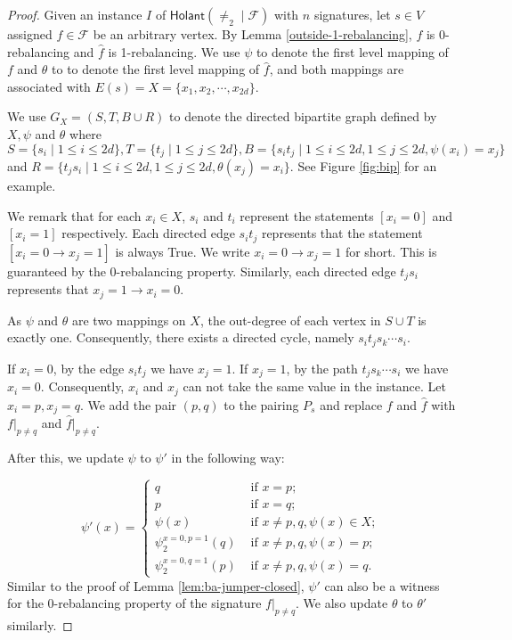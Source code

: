 \documentclass[a4paper,UKenglish,cleveref, autoref, thm-restate]{lipics-v2021}
\newcommand{\hol}[0]{\textsf{Holant}}
\newcommand{\ba}[1][0]{{{#1}-rebalancing}}
\begin{document}
\begin{proof}
    Given an instance $I$ of $\hol(\neq_2\mid\mathcal{F})$ with $n$ signatures, let $s\in V$ assigned $f\in\mathcal{F}$ be an arbitrary vertex. By Lemma \ref{outside-1-rebalancing}, $f$ is \ba[0] and $\hat{f}$ is \ba[1]. We use $\psi$ to denote the first level mapping of $f$ and $\theta$ to to denote the first level mapping of $\hat{f}$, and both mappings are associated with $E(s)=X=\{x_1,x_2, \cdots, x_{2d}\}$.

    We use $G_X=(S,T,B\cup R)$ to denote the directed bipartite graph defined by $X,\psi$ and $\theta$ where $S=\{s_i\mid 1\le i\le 2d\},T=\{t_j\mid 1\le j\le 2d\}, B=\{s_it_j\mid 1\le i\le 2d,1\le j\le 2d, \psi(x_i)=x_j\}$ and $R=\{t_js_i\mid 1\le i\le 2d,1\le j\le 2d, \theta(x_j)=x_i\}$. See Figure \ref{fig:bip} for an example.

We remark that for each $x_i\in X$, $s_i$ and $t_i$ represent the statements $[x_i=0]$ and $[x_i=1]$ respectively. Each directed edge $s_it_j$ represents that the statement $[x_i=0\to x_j=1]$ is always True. We write $x_i=0\to x_j=1$ for short. This is guaranteed by the 0-rebalancing property. Similarly, each directed edge $t_js_i$ represents that $ x_j=1\to x_i=0$.

     As $\psi$ and $\theta$ are two mappings on $X$, the out-degree of each vertex in $S\cup T$ is exactly one. Consequently, there exists a directed cycle, namely $s_it_js_k\cdots s_i$.

     If $x_i=0$, by the edge $s_it_j$ we have $x_j=1$. If $x_j=1$, by the path $t_js_k\cdots s_i$ we have $x_i=0$. Consequently, $x_i$ and $x_j$ can not take the same value in the instance. Let $x_i=p,x_j=q$.  We add the pair $(p,q)$ to the pairing $P_s$ and replace $f$ and $\hat{f}$ with $f|_{p\neq q}$ and $\hat{f}|_{p\neq q}$.

    After this, we update $\psi$ to $\psi'$ in the following way:

     \[
\psi'(x)= \left \{ \begin{array}{ll}
q &  \text{ if }  x=p;  \\
p &  \text{ if }  x=q; \\
    \psi(x) &  \text{ if } x\neq p,q, \psi(x)\in X ; \\
    \psi_2^{x=0,p=1}(q) &   \text{ if }  x\neq p,q,\psi(x)=p ;\\
    \psi_2^{x=0,q=1}(p) &   \text{ if }  x\neq p,q,\psi(x)=q .
\end{array}  \right.
\]
Similar to the proof of Lemma \ref{lem:ba-jumper-closed}, $\psi'$ can also be a witness for the 0-rebalancing property of the signature $f|_{p\neq q}$. We also update $\theta$ to $\theta'$ similarly. 


\end{proof}
\end{document}
